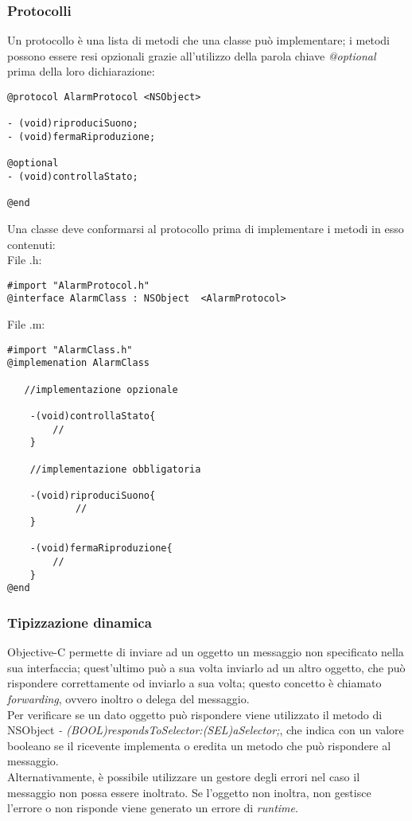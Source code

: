 \subsubsection{Protocolli}
Un protocollo è una lista di metodi che una classe può implementare; i metodi possono essere resi opzionali grazie all'utilizzo della parola chiave \textit{@optional} prima della loro dichiarazione: 
\lstset{language=[Objective]C, breakindent=40pt, breaklines}
\begin{lstlisting}
@protocol AlarmProtocol <NSObject>

- (void)riproduciSuono;
- (void)fermaRiproduzione;

@optional
- (void)controllaStato;

@end
\end{lstlisting}
\newpage
Una classe deve conformarsi al protocollo prima di implementare i metodi in esso contenuti:\\
File .h: 
\lstset{language=[Objective]C, breakindent=40pt, breaklines}
\begin{lstlisting}
#import "AlarmProtocol.h"
@interface AlarmClass : NSObject  <AlarmProtocol>
\end{lstlisting}
File .m:
\lstset{language=[Objective]C, breakindent=40pt, breaklines}
\begin{lstlisting}
#import "AlarmClass.h"
@implemenation AlarmClass
  
   //implementazione opzionale 
    
    -(void)controllaStato{
		//
    }

    //implementazione obbligatoria  
   
    -(void)riproduciSuono{
    	    // 
    }
    
    -(void)fermaRiproduzione{
   	 	//
    }
@end
\end{lstlisting}
\subsubsection{Tipizzazione dinamica}
Objective-C permette di inviare ad un oggetto un messaggio non specificato nella sua interfaccia; quest'ultimo può a sua volta inviarlo ad un altro oggetto, che può rispondere correttamente od inviarlo a sua volta; questo concetto è chiamato \textit{forwarding}, ovvero inoltro o delega del messaggio.\\Per verificare se un dato oggetto può rispondere viene utilizzato il metodo di NSObject \textit{- (BOOL)respondsToSelector:(SEL)aSelector;}, che indica con un valore booleano se il ricevente implementa o eredita un metodo che può rispondere al messaggio.\\Alternativamente, è possibile utilizzare un gestore degli errori nel caso il messaggio non possa essere inoltrato. Se l'oggetto non inoltra, non gestisce l'errore o non risponde viene generato un errore di \textit{runtime}. 
